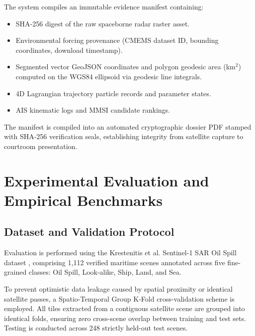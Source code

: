 \documentclass[conference]{IEEEtran}
\begin{document}
The system compiles an immutable evidence manifest containing:
\begin{itemize}
    \item SHA-256 digest of the raw spaceborne radar raster asset.
    \item Environmental forcing provenance (CMEMS dataset ID, bounding coordinates, download timestamp).
    \item Segmented vector GeoJSON coordinates and polygon geodesic area (km$^2$) computed on the WGS84 ellipsoid via geodesic line integrals.
    \item 4D Lagrangian trajectory particle records and parameter states.
    \item AIS kinematic logs and MMSI candidate rankings.
\end{itemize}
The manifest is compiled into an automated cryptographic dossier PDF stamped with SHA-256 verification seals, establishing integrity from satellite capture to courtroom presentation.

\section{Experimental Evaluation and Empirical Benchmarks}

\subsection{Dataset and Validation Protocol}
Evaluation is performed using the Krestenitis et al. Sentinel-1 SAR Oil Spill dataset \cite{krestenitis2019oil}, comprising 1,112 verified maritime scenes annotated across five fine-grained classes: Oil Spill, Look-alike, Ship, Land, and Sea.

To prevent optimistic data leakage caused by spatial proximity or identical satellite passes, a Spatio-Temporal Group K-Fold cross-validation scheme is employed. All tiles extracted from a contiguous satellite scene are grouped into identical folds, ensuring zero cross-scene overlap between training and test sets. Testing is conducted across 248 strictly held-out test scenes.
\end{document}
